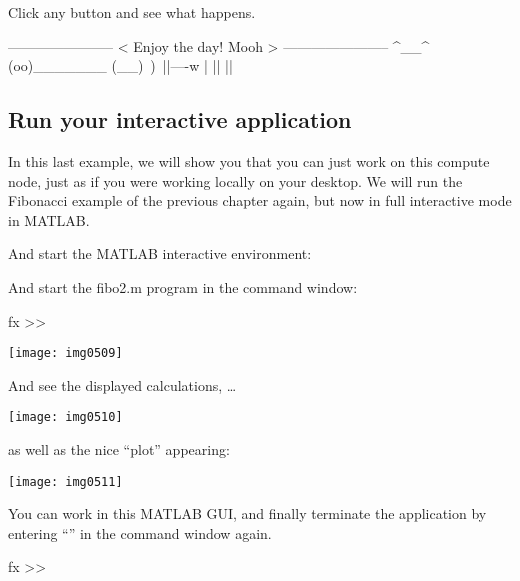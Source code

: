 Click any button and see what happens.

\begin{prompt}
-----------------------
< Enjoy the day! Mooh >
-----------------------
     ^__^
     (oo)\_______
     (__)\       )\/\
         ||----w |
         ||     ||

\end{prompt}

\ifgent
\else

\subsection{Run your interactive application}

In this last example, we will show you that you can just work on this compute
node, just as if you were working locally on your desktop.  We will run the
Fibonacci example of the previous chapter again, but now in full interactive
mode in MATLAB.

\begin{prompt}
\end{prompt}

And start the MATLAB interactive environment:

\begin{prompt}
\end{prompt}

And start the fibo2.m program in the command window:

\begin{prompt}
fx >> %
\end{prompt}

\begin{center}
\texttt{[image: img0509]}
\end{center}

And see the displayed calculations, \dots

\begin{center}
\texttt{[image: img0510]}
\end{center}

as well as the nice ``plot'' appearing:

\begin{center}
\texttt{[image: img0511]}
\end{center}

You can work in this MATLAB GUI, and finally terminate the application by
entering ``\strong{exit}'' in the command window again.

\begin{prompt}
fx >> %
\end{prompt}

\fi %
